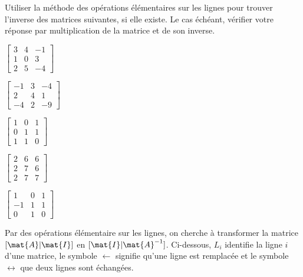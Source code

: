 \begin{exercice}
  \label{ex:revision:inverse_par_op_elementaires}
  Utiliser la méthode des opérations élémentaires sur les lignes pour
  trouver l'inverse des matrices suivantes, si elle existe. Le cas
  échéant, vérifier votre réponse par multiplication de la matrice et
  de son inverse.
  \begin{enumerate}
    \begin{multicols}{3}
    \item $%
      \begin{bmatrix}
        3 & 4 & -1 \\ 1 & 0 & 3 \\ 2 & 5 & -4
      \end{bmatrix}$
    \item $%
      \begin{bmatrix}
        -1 & 3 & -4 \\ 2 & 4 & 1 \\ -4 & 2 & -9
      \end{bmatrix}$
    \item $%
      \begin{bmatrix}
        1 & 0 & 1 \\ 0 & 1 & 1 \\ 1 & 1 & 0
      \end{bmatrix}$
    \end{multicols}
    \begin{multicols}{3}
    \item $%
      \begin{bmatrix}
        2 & 6 & 6 \\ 2 & 7 & 6 \\ 2 & 7 & 7
      \end{bmatrix}$
    \item $%
      \begin{bmatrix}
        1 & 0 & 1 \\ -1 & 1 & 1 \\ 0 & 1 & 0
      \end{bmatrix}$
    \end{multicols}
  \end{enumerate}
  \begin{sol}
    Par des opérations élémentaire sur les lignes, on cherche à
    transformer la matrice $[\mat{A}|\mat{I}]$ en
    $[\mat{I}|\mat{A}^{-1}]$. Ci-dessous, $L_i$ identifie la ligne $i$
    d'une matrice, le symbole $\leftarrow$ signifie qu'une ligne est
    remplacée et le symbole $\leftrightarrow$ que deux lignes sont
    échangées.
    \begin{enumerate}

\end{enumerate}
\end{sol}
\end{exercice}
